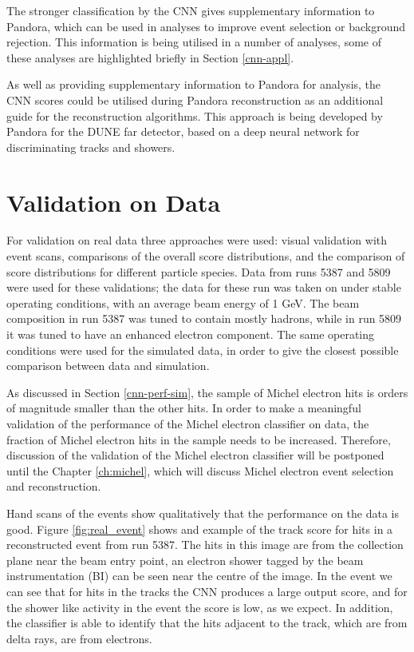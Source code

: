 The stronger classification by the CNN gives supplementary information to
Pandora, which can be used in analyses to improve event selection or background
rejection. This information is being utilised in a number of \protodune{}
analyses, some of these analyses are highlighted briefly in Section
\ref{cnn-appl}.

As well as providing supplementary information to Pandora for analysis, the CNN
scores could be utilised during Pandora reconstruction as an additional guide
for the reconstruction algorithms. This approach is being developed by Pandora
for the DUNE far detector, based on a deep neural network for discriminating 
tracks and showers\cite{TODO:Neutrino2020Poster}.

\section{Validation on \protodune{} Data} \label{cnn-perf-data}

For validation on real \protodune{} data three approaches were used: visual
validation with event scans, comparisons of the overall score distributions, 
and the comparison of score distributions for different particle species. Data 
from \protodune{} runs 5387 and 5809 were used for these validations; the data 
for these run was taken on under stable operating conditions, with an average 
beam energy of 1 GeV. The beam composition in run 5387 was tuned to contain
mostly hadrons, while in run 5809 it was tuned to have an enhanced electron
component. The same operating conditions were used for the simulated data, in
order to give the closest possible comparison between data and simulation.

As discussed in Section \ref{cnn-perf-sim}, the sample of Michel electron hits
is orders of magnitude smaller than the other hits. In order to make a
meaningful validation of the performance of the Michel electron classifier on
data, the fraction of Michel electron hits in the sample needs to be increased.
Therefore, discussion of the validation of the Michel electron classifier will 
be postponed until the Chapter \ref{ch:michel}, which will discuss Michel 
electron event selection and reconstruction.

Hand scans of the events show qualitatively that the performance on the data is
good. Figure \ref{fig:real_event} shows and example of the track score for hits
in a reconstructed event from run 5387. The hits in this image are from the
collection plane near the beam entry point, an electron shower tagged by the
beam instrumentation (BI) can be seen near the centre of the image. In the event
we can see that for hits in the tracks the CNN produces a large output score,
and for the shower like activity in the event the score is low, as we expect. In
addition, the classifier is able to identify that the hits adjacent to the 
track, which are from delta rays, are from electrons.

